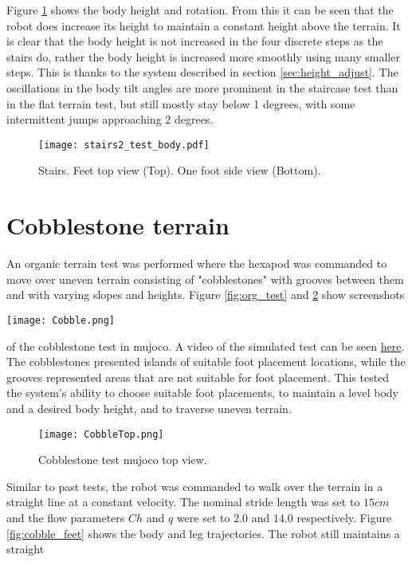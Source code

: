    \noindent
    Figure \ref{fig:stairs_body} shows the body height and rotation. From this it can be seen that the robot does increase its height to maintain a constant height above the terrain. It is clear that the body height is not increased in the four discrete steps as the stairs do, rather the body height is increased more smoothly using many smaller steps. This is thanks to the system described in section \ref{sec:height_adjust}.
    The oscillations in the body tilt angles are more prominent in the staircase test than in the flat terrain test, but still mostly stay below 1 degrees, with some intermittent jumps approaching 2 degrees.
    \begin{figure}[h]
        \centering
        \texttt{[image: stairs2\_test\_body.pdf]}
        \caption{Stairs. Feet top view (Top). One foot side view (Bottom).}
        \label{fig:stairs_body}
    \end{figure}

    \section{Cobblestone terrain}
    An organic terrain test was performed where the hexapod was commanded to move over uneven terrain consisting of "cobblestones" with grooves between them and with varying slopes and heights. Figure \ref{fig:org_test} and \ref{fig:org_test_top} show screenshots
    \begin{center}
        \texttt{[image: Cobble.png]}
        \label{fig:org_test}
    \end{center}
    of the cobblestone test in \ac{mujoco}. A video of the simulated test can be seen \href{https://youtu.be/-lQjvykGlmY}{\underline{here}}. The cobblestones presented islands of suitable foot placement locations, while the grooves represented areas that are not suitable for foot placement. This tested the system's ability to choose suitable foot placements, to maintain a level body and a desired body height, and to traverse uneven terrain.
    \begin{figure}[h]
        \centering
        \texttt{[image: CobbleTop.png]}
        \caption{Cobblestone test \ac{mujoco} top view.}
        \label{fig:org_test_top}
    \end{figure}

    \noindent
    Similar to past tests, the robot was commanded to walk over the terrain in a straight line at a constant velocity. The nominal stride length was set to \(15cm\) and the flow parameters \(Ch\) and \(q\) were set to \(2.0\) and \(14.0\) respectively. Figure \ref{fig:cobble_feet} shows the body and leg trajectories. The robot still maintains a straight

